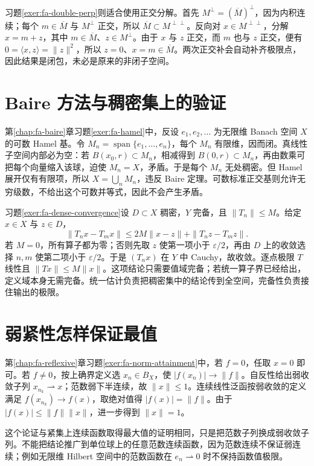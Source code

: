 习题\ref{exer:fa-double-perp}则适合使用正交分解。首先 $M^\perp=(\overline M)^\perp$，因为内积连续；每个 $m\in\overline M$ 与 $M^\perp$ 正交，所以 $\overline M\subset M^{\perp\perp}$。反向对 $x\in M^{\perp\perp}$，分解 $x=m+z$，其中 $m\in\overline M$、$z\in M^\perp$。由于 $x$ 与 $z$ 正交，而 $m$ 也与 $z$ 正交，便有 $0=\langle x,z\rangle=\|z\|^2$，所以 $z=0$、$x=m\in\overline M$。两次正交补会自动补齐极限点，因此结果是闭包，未必是原来的非闭子空间。

\section{Baire 方法与稠密集上的验证}
第\ref{chap:fa-baire}章习题\ref{exer:fa-hamel}中，反设 $e_1,e_2,\ldots$ 为无限维 Banach 空间 $X$ 的可数 Hamel 基。令 $M_n=\operatorname{span}\{e_1,\ldots,e_n\}$，每个 $M_n$ 有限维，因而闭。真线性子空间内部必为空：若 $B(x_0,r)\subset M_n$，相减得到 $B(0,r)\subset M_n$，再由数乘可把每个向量缩入该球，迫使 $M_n=X$，矛盾。于是每个 $M_n$ 无处稠密。但 Hamel 展开仅有有限项，所以 $X=\bigcup_nM_n$，违反 Baire 定理。可数标准正交基则允许无穷级数，不给出这个可数并等式，因此不会产生矛盾。

习题\ref{exer:fa-dense-convergence}设 $D\subset X$ 稠密，$Y$ 完备，且 $\|T_n\|\leq M$。给定 $x\in X$ 与 $z\in D$，
\[
 \|T_nx-T_mx\|\leq2M\|x-z\|+\|T_nz-T_mz\|.
\]
若 $M=0$，所有算子都为零；否则先取 $z$ 使第一项小于 $\varepsilon/2$，再由 $D$ 上的收敛选择 $n,m$ 使第二项小于 $\varepsilon/2$。于是 $(T_nx)$ 在 $Y$ 中 Cauchy，故收敛。逐点极限 $T$ 线性且 $\|Tx\|\leq M\|x\|$。这项结论只需要值域完备；若统一算子界已经给出，定义域本身无需完备。统一估计负责把稠密集中的结论传到全空间，完备性负责接住输出的极限。

\section{弱紧性怎样保证最值}
第\ref{chap:fa-reflexive}章习题\ref{exer:fa-norm-attainment}中，若 $f=0$，任取 $x=0$ 即可。若 $f\ne0$，按上确界定义选 $x_n\in B_X$，使 $|f(x_n)|\to\|f\|$。自反性给出弱收敛子列 $x_{n_k}\rightharpoonup x$；范数弱下半连续，故 $\|x\|\leq1$。连续线性泛函按弱收敛的定义满足 $f(x_{n_k})\to f(x)$，取绝对值得 $|f(x)|=\|f\|$。由于 $|f(x)|\leq\|f\|\|x\|$，进一步得到 $\|x\|=1$。

这个论证与紧集上连续函数取得最大值的证明相同，只是把范数子列换成弱收敛子列。不能把结论推广到单位球上的任意范数连续函数，因为范数连续不保证弱连续；例如无限维 Hilbert 空间中的范数函数在 $e_n\rightharpoonup0$ 时不保持函数值极限。

